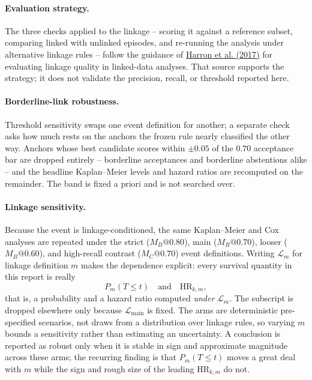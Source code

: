 \documentclass[11pt,a4paper]{article}
\begin{document}
\paragraph{Evaluation strategy.} The three checks applied to the linkage --
scoring it against a reference subset, comparing linked with unlinked episodes,
and re-running the analysis under alternative linkage rules -- follow the guidance
of \href{https://doi.org/10.1093/ije/dyx177}{Harron et al. (2017)} for
evaluating linkage quality in linked-data analyses. That source supports the
strategy; it does not validate the precision, recall, or threshold reported here.

\paragraph{Borderline-link robustness.} Threshold sensitivity swaps one event
definition for another; a separate check asks how much rests on the anchors the
frozen rule nearly classified the other way. Anchors whose best candidate scores
within \(\pm0.05\) of the \(0.70\) acceptance bar are dropped entirely --
borderline acceptances and borderline abstentions alike -- and the headline
Kaplan--Meier levels and hazard ratios are recomputed on the remainder. The band
is fixed a priori and is not searched over.

\paragraph{Linkage sensitivity.} Because the event is linkage-conditioned, the
same Kaplan--Meier and Cox analyses are repeated under the strict
(\(M_B@0.80\)), main (\(M_B@0.70\)), looser (\(M_B@0.60\)), and high-recall
contrast (\(M_C@0.70\)) event definitions. Writing \(\mathcal{L}_m\) for
linkage definition \(m\) makes the dependence explicit: every survival quantity
in this report is really
\[
P_m(T\le t)
\quad\text{and}\quad
\mathrm{HR}_{k,m},
\]
that is, a probability and a hazard ratio computed \emph{under}
\(\mathcal{L}_m\). The subscript is dropped elsewhere only because
\(\mathcal{L}_{\text{main}}\) is fixed. The arms are deterministic
pre-specified scenarios, not draws from a distribution over linkage rules, so
varying \(m\) bounds a sensitivity rather than estimating an uncertainty. A
conclusion is reported as robust only when it is stable in sign and approximate
magnitude across these arms; the recurring finding is that \(P_m(T\le t)\) moves
a great deal with \(m\) while the sign and rough size of the leading
\(\mathrm{HR}_{k,m}\) do not.
\end{document}
